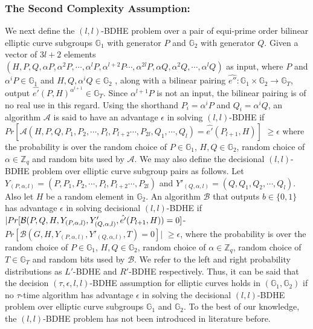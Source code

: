 \subsubsection{The Second Complexity Assumption:} 
\label{subsubsec:asm_2}

We next define the $(l,l)$-BDHE problem over a pair of equi-prime order bilinear elliptic curve subgroups $\mathbb{G}_1$ with generator $P$ and $\mathbb{G}_2$ with generator $Q$. Given a vector of $3l+2$ elements\\ $(H,P,Q, \alpha P, {\alpha}^2P,\cdots,{\alpha}^{l}P,{\alpha}^{l+2}P\cdots,{\alpha}^{2l}P,\alpha Q, {\alpha}^2Q,\cdots,{\alpha}^{l}Q)$ as input, where $P$ and ${\alpha}^iP \in \mathbb{G}_1$ and $H,Q,\alpha^iQ \in \mathbb{G}_2$ , along with a bilinear pairing $\hat{e''}:\mathbb{G}_1 \times \mathbb{G}_2\longrightarrow\mathbb{G}_T$, output $\hat{e'}(P,H)^{\alpha^{l+1}}\in\mathbb{G}_T$. Since ${\alpha}^{l+1}P$ is not an input, the bilinear pairing is of no real use in this regard. Using the shorthand $P_i = \alpha^{i}P$ and $Q_i=\alpha^{i}Q$, an algorithm $\mathcal{A}$ is said to have an advantage $\epsilon$ in solving $(l,l)$-BDHE if 
$Pr[\mathcal{A}(H,P,Q,P_1, P_2,\cdots,P_l,P_{l+2}\cdots,P_{2l},Q_1,\cdots,Q_l)=\hat{e'}(P_{l+1},H)]$ $\geq \epsilon$
where the probability is over the random choice of $P \in \mathbb{G}_1$, $H,Q \in \mathbb{G}_2$, random choice of $\alpha \in \mathbb{Z}_q$ and random bits used by $\mathcal{A}$. We may also define the decisional $(l,l)$-BDHE problem over elliptic curve subgroup pairs as follows. Let $Y_{(P,\alpha,l)}=(P,P_1, P_2,\cdots,P_l,P_{l+2}\cdots,P_{2l})$ and $Y'_{(Q,\alpha,l)}=(Q,Q_1, Q_2,\cdots,Q_l)$. Also let $H$ be a random element in $\mathbb{G}_2$. An algorithm $\mathcal{B}$ that outputs $b\in\{0,1\}$ has advantage $\epsilon$ in solving decisional $(l,l)$-BDHE if $|Pr[\mathcal{B}(P,Q,H,Y_{(P,\alpha,l)},Y'_{(Q,\alpha,l)},\hat{e'}(P_{l+1},H))\\=0]$-$Pr[\mathcal{B}(G,H,Y_{(P,\alpha,l)},Y'_{(Q,\alpha,l)},T)=0]|$ $\geq \epsilon$, where the probability is over the random choice of $P \in \mathbb{G}_1$, $H,Q \in \mathbb{G}_2$, random choice of $\alpha \in \mathbb{Z}_q$, random choice of $T\in \mathbb{G}_T$ and random bits used by $\mathcal{B}$. We refer to the left and right probability distributions as $L'$-BDHE and $R'$-BDHE respectively. Thus, it can be said that the decision $(\tau,\epsilon,l,l)$-BDHE assumption for elliptic curves holds in $(\mathbb{G}_1,\mathbb{G}_2)$ if no $\tau$-time algorithm has advantage $\epsilon$  in solving the decisional $(l,l)$-BDHE problem over elliptic curve subgroups $\mathbb{G}_1$ and $\mathbb{G}_2$. To the best of our knowledge, the $(l,l)$-BDHE problem has not been introduced in literature before.

